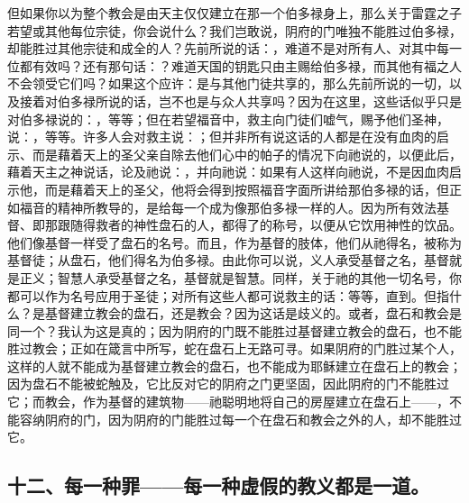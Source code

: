 但如果你以为整个教会是由天主仅仅建立在那一个伯多禄身上，那么关于雷霆之子若望或其他每位宗徒，你会说什么？我们岂敢说，阴府的门唯独不能胜过伯多禄，却能胜过其他宗徒和成全的人？先前所说的话：，难道不是对所有人、对其中每一位都有效吗？还有那句话：？难道天国的钥匙只由主赐给伯多禄，而其他有福之人不会领受它们吗？如果这个应许：是与其他门徒共享的，那么先前所说的一切，以及接着对伯多禄所说的话，岂不也是与众人共享吗？因为在这里，这些话似乎只是对伯多禄说的：，等等；但在若望福音中，救主向门徒们嘘气，赐予他们圣神，说：，等等。许多人会对救主说：；但并非所有说这话的人都是在没有血肉的启示、而是藉着天上的圣父亲自除去他们心中的帕子的情况下向祂说的，以便此后，藉着天主之神说话，论及祂说：，并向祂说：如果有人这样向祂说，不是因血肉启示他，而是藉着天上的圣父，他将会得到按照福音字面所讲给那伯多禄的话，但正如福音的精神所教导的，是给每一个成为像那伯多禄一样的人。因为所有效法基督、即那跟随得救者的神性盘石的人，都得了的称号，以便从它饮用神性的饮品。他们像基督一样受了盘石的名号。而且，作为基督的肢体，他们从祂得名，被称为基督徒；从盘石，他们得名为伯多禄。由此你可以说，义人承受基督之名，基督就是正义；智慧人承受基督之名，基督就是智慧。同样，关于祂的其他一切名号，你都可以作为名号应用于圣徒；对所有这些人都可说救主的话：等等，直到。但指什么？是基督建立教会的盘石，还是教会？因为这话是歧义的。或者，盘石和教会是同一个？我认为这是真的；因为阴府的门既不能胜过基督建立教会的盘石，也不能胜过教会；正如在箴言中所写，蛇在盘石上无路可寻。如果阴府的门胜过某个人，这样的人就不能成为基督建立教会的盘石，也不能成为耶稣建立在盘石上的教会；因为盘石不能被蛇触及，它比反对它的阴府之门更坚固，因此阴府的门不能胜过它；而教会，作为基督的建筑物——祂聪明地将自己的房屋建立在盘石上——，不能容纳阴府的门，因为阴府的门能胜过每一个在盘石和教会之外的人，却不能胜过它。\par


\subsection{十二、每一种罪——每一种虚假的教义都是一道。}

